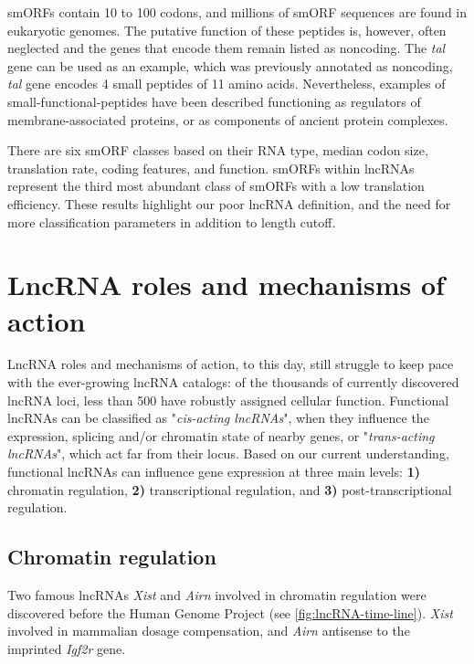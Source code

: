 smORFs contain 10 to 100 codons, and millions of smORF sequences are found in eukaryotic genomes.\autocite{couso_2017_smORF,andrews_2014_smorf} The putative function of these peptides is, however, often neglected and the genes that encode them remain listed as noncoding. The \textit{tal} gene can be used as an example, which was previously annotated as noncoding, \textit{tal} gene encodes 4 small peptides of 11 amino acids.\autocite{couso_2017_smORF} Nevertheless, examples of small-functional-peptides have been described functioning as regulators of membrane-associated proteins, or as components of ancient protein complexes.\autocite{pueyo_2016_peptides}

There are six smORF classes based on their RNA type, median codon size, translation rate, coding features, and function. smORFs within lncRNAs represent the third most abundant class of smORFs with a low translation efficiency.\autocite{couso_2017_smORF} These results highlight our poor lncRNA definition, and the need for more classification parameters in addition to length cutoff.  

\clearpage

\section{LncRNA roles and mechanisms of action}
\label{sec:lncRNA-function}

LncRNA roles and mechanisms of action, to this day, still struggle to keep pace with the ever-growing lncRNA catalogs: of the thousands of currently discovered lncRNA loci, less than 500 have robustly assigned cellular function.\autocite{quek_2015_lncrnadb} Functional lncRNAs can be classified as "\textit{cis-acting lncRNAs}", when they influence the expression, splicing and/or chromatin state of nearby genes, or "\textit{trans-acting lncRNAs}", which act far from their locus.\autocite{kopp_2018_functional} Based on our current understanding, functional lncRNAs can influence gene expression at three main levels: \textbf{1)} chromatin regulation, \textbf{2)} transcriptional regulation, and \textbf{3)} post-transcriptional regulation.\autocite{statello_2021_lncRNA_reg,li_2019_insights}

\subsection{Chromatin regulation}
\label{sub-sec:lncRNA_chromatin_reg}

Two famous lncRNAs \textit{Xist} and \textit{Airn} involved in chromatin regulation were discovered before the Human Genome Project (see \autoref{fig:lncRNA-time-line}). \textit{Xist} involved in mammalian dosage compensation, and \textit{Airn} antisense to the imprinted \textit{Igf2r} gene.\autocite{loda_2019_xist,santoro_2013_airn}


